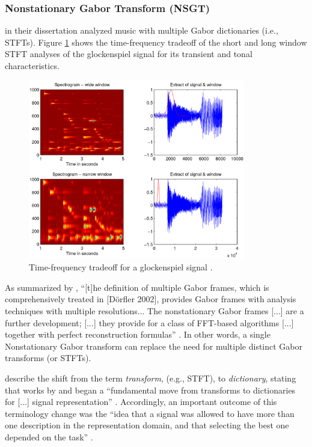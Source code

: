 \documentclass[report.tex]{subfiles}
\begin{document}
\newpagefill

\subsubsection{Nonstationary Gabor Transform (NSGT)}
\label{sec:theorynsgt}

\textcite{doerflerphd} in their dissertation analyzed music with multiple Gabor dictionaries (i.e., STFTs). Figure \ref{fig:dorflertradeoff} shows the time-frequency tradeoff of the short and long window STFT analyses of the glockenspiel signal for its transient and tonal characteristics.

\begin{figure}[ht]
	\centering
	\includegraphics[width=0.8438\textwidth]{./images-tftheory/tf_tradeoff_dorfler.png}
	\caption{Time-frequency tradeoff for a glockenspiel signal \parencite[20]{doerflerphd}.}
	\label{fig:dorflertradeoff}
\end{figure}

As summarized by \citeauthor{adaptivecqt}, ``[t]he definition of multiple Gabor frames, which is comprehensively treated in [D{\"o}rfler 2002], provides Gabor frames with analysis techniques with multiple resolutions... The nonstationary Gabor frames [...] are a further development; [...] they provide for a class of FFT-based algorithms [...] together with perfect reconstruction formulas'' \parencite[2]{adaptivecqt}. In other words, a single Nonstationary Gabor transform can replace the need for multiple distinct Gabor transforms (or STFTs).

\citeauthor{dictionary} describe the shift from the term \textit{transform}, (e.g., STFT), to \textit{dictionary}, stating that works by \cite{dictionary1} and \cite{dictionary2} began a ``fundamental move from transforms to dictionaries for [...] signal representation'' \parencite[1049]{dictionary}. Accordingly, an important outcome of this terminology change was the ``idea that a signal was allowed to have more than one description in the representation domain, and that selecting the best one depended on the task'' \parencite[1049]{dictionary}.
\end{document}
